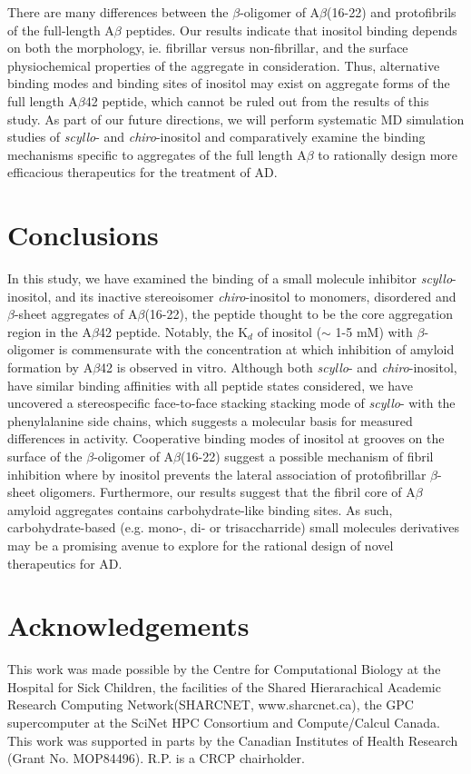 There are many differences between the $\beta$-oligomer of A$\beta$(16-22) and protofibrils of  the full-length A$\beta$ peptides. Our results indicate that inositol binding depends on both the morphology, ie. fibrillar versus non-fibrillar, and the surface physiochemical properties of the aggregate in consideration. Thus, alternative binding modes and binding sites of inositol may exist on aggregate forms of the full length A$\beta$42 peptide, which cannot be ruled out from the results of this study. As part of our future directions, we will perform systematic MD simulation studies of \emph{scyllo}- and \emph{chiro}-inositol and comparatively examine the binding mechanisms specific to aggregates of the full length A$\beta$ to rationally design more efficacious therapeutics for the treatment of AD.


\section{Conclusions} %
\label{sec:conclusions}

In this study, we have examined the binding of a small molecule inhibitor \emph{scyllo}-inositol, and its inactive stereoisomer \emph{chiro}-inositol to monomers, disordered and $\beta$-sheet aggregates of A$\beta$(16-22), the peptide thought to be the core aggregation region in the A$\beta$42 peptide. Notably, the K$_{d}$ of inositol ($\sim$ 1-5 mM) with $\beta$-oligomer is commensurate with the concentration at which inhibition of amyloid formation by A$\beta$42 is observed in vitro. Although both \emph{scyllo}- and \emph{chiro}-inositol, have similar binding affinities with all peptide states considered, we have uncovered a stereospecific face-to-face stacking stacking mode of \emph{scyllo}- with the phenylalanine side chains, which suggests a molecular basis for measured differences in activity.  Cooperative binding modes of inositol at grooves on the surface of the $\beta$-oligomer of A$\beta$(16-22) suggest a possible mechanism of fibril inhibition where by inositol prevents the lateral association of protofibrillar $\beta$-sheet oligomers. Furthermore, our results suggest that the fibril core of A$\beta$ amyloid aggregates contains carbohydrate-like binding sites. As such, carbohydrate-based (e.g. mono-, di- or trisaccharride) small molecules derivatives may be a promising avenue to explore for the rational design of novel therapeutics for AD.

\section*{Acknowledgements}
This work was made possible by the Centre for Computational Biology at the Hospital for Sick Children, the facilities of the Shared Hierarachical Academic Research Computing Network(SHARCNET, www.sharcnet.ca), the GPC supercomputer at the SciNet HPC Consortium and Compute/Calcul Canada. This work was supported in parts by the Canadian Institutes of Health Research (Grant No. MOP84496). R.P. is a CRCP chairholder.



